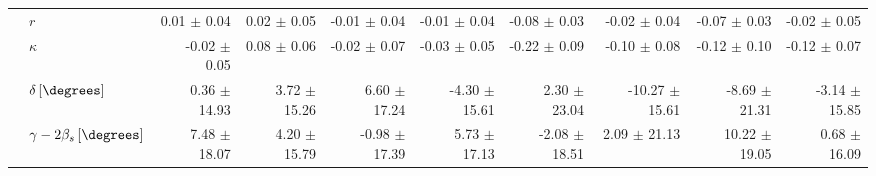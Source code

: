 \begin{tabular}{l l  r  r  r  r  r  r  r  r  }
 & $r$ & 0.01 $\pm$ 0.04 & 0.02 $\pm$ 0.05 & -0.01 $\pm$ 0.04 & -0.01 $\pm$ 0.04 & -0.08 $\pm$ 0.03 & -0.02 $\pm$ 0.04 & -0.07 $\pm$ 0.03 & -0.02 $\pm$ 0.05 \\ 
 & $\kappa$ & -0.02 $\pm$ 0.05 & 0.08 $\pm$ 0.06 & -0.02 $\pm$ 0.07 & -0.03 $\pm$ 0.05 & -0.22 $\pm$ 0.09 & -0.10 $\pm$ 0.08 & -0.12 $\pm$ 0.10 & -0.12 $\pm$ 0.07 \\ 
 & $\delta \, [\degrees]$ & 0.36 $\pm$ 14.93 & 3.72 $\pm$ 15.26 & 6.60 $\pm$ 17.24 & -4.30 $\pm$ 15.61 & 2.30 $\pm$ 23.04 & -10.27 $\pm$ 15.61 & -8.69 $\pm$ 21.31 & -3.14 $\pm$ 15.85 \\ 
 & $\gamma - 2 \beta_{s} \, [\degrees]$ & 7.48 $\pm$ 18.07 & 4.20 $\pm$ 15.79 & -0.98 $\pm$ 17.39 & 5.73 $\pm$ 17.13 & -2.08 $\pm$ 18.51 & 2.09 $\pm$ 21.13 & 10.22 $\pm$ 19.05 & 0.68 $\pm$ 16.09 \\ 
\hline
\hline
\end{tabular}

